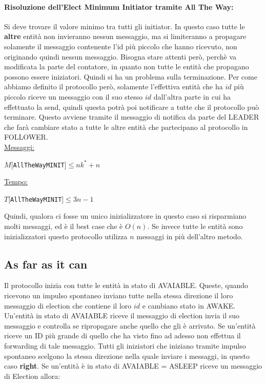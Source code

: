 \paragraph{Risoluzione dell'Elect Minimum Initiator tramite All The Way:} Si deve
trovare il valore minimo tra tutti gli initiator. In questo caso tutte le
\textbf{altre} entità non invieranno nessun messaggio, ma si limiteranno a
propagare solamente il messaggio contenente l'id più piccolo che hanno ricevuto,
non originando quindi nessun messaggio. Bisogna stare attenti però, perchè va
modificata la parte del contatore, in quanto non tutte le entità che propagano
possono essere iniziatori. Quindi si ha un problema sulla terminazione. Per come
abbiamo definito il protocollo però, solamente l'effettiva entità che ha $id$
più piccolo riceve un messaggio con il suo stesso $id$ dall'altra parte in cui
ha effettuato la send, quindi questa potrà poi notificare a tutte che il
protocollo può terminare. Questo avviene tramite il messaggio di notifica da
parte del LEADER che farà cambiare stato a tutte le altre entità che partecipano
al protocollo in FOLLOWER.\\
\underline{Messaggi:}
\begin{center}
    $M[$\texttt{AllTheWayMINIT}$] \leq nk^* + n $
\end{center}
\underline{Tempo:}
\begin{center}
    $T[$\texttt{AllTheWayMINIT}$] \leq 3n - 1$
\end{center}
Quindi, qualora ci fosse un unico inizializzatore in questo caso si risparmiano
molti messaggi, ed è il best case che è $O(n)$. Se invece tutte le entità sono
inizializzatori questo protocollo utilizza $n$ messaggi in più dell'altro
metodo.

\subsection{As far as it can}\label{asfar}

Il protocollo inizia con tutte le
entità in stato di AVAIABLE. Queste, quando ricevono un impulso spontaneo
inviano tutte nella stessa direzione il loro messaggio di election che contiene
il loro $id$ e cambiano stato in AWAKE. Un'entità in stato di AVAIABLE riceve il
messaggio di election invia il suo messaggio e controlla se ripropagare anche
quello che gli è arrivato. Se un'entità riceve un ID più grande di quello che ha
visto fino ad adesso non effettua il forwarding di tale messaggio. Tutti gli
iniziatori che iniziano tramite impulso spontaneo scelgono la stessa direzione
nella quale inviare i messaggi, in questo caso \textbf{right}. Se un'entità è in
stato di AVAIABLE = ASLEEP riceve un messaggio di Election allora:

